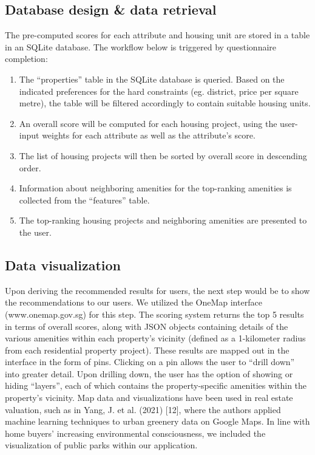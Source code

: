 \documentclass[a4paper, 11pt]{article}
\begin{document}
\subsection{Database design \& data retrieval}

The pre-computed scores for each attribute and housing unit are stored in a table in an SQLite database. The workflow below is triggered by questionnaire completion:

\begin{enumerate}
    \item The “properties” table in the SQLite database is queried. Based on the indicated preferences for the hard constraints (eg. district, price per square metre), the table will be filtered accordingly to contain suitable housing units.
    \item An overall score will be computed for each housing project, using the user-input weights for each attribute as well as the attribute’s score.
    \item The list of housing projects will then be sorted by overall score in descending order.
    \item Information about neighboring amenities for the top-ranking amenities is collected from the “features” table.
    \item The top-ranking housing projects and neighboring amenities are presented to the user.
\end{enumerate}

\subsection{Data visualization}

Upon deriving the recommended results for users, the next step would be to show the recommendations to our users. We utilized the OneMap interface (www.onemap.gov.sg) for this step. The scoring system returns the top 5 results in terms of overall scores, along with JSON objects containing details of the various amenities within each property's vicinity (defined as a 1-kilometer radius from each residential property project). These results are mapped out in the interface in the form of pins. Clicking on a pin allows the user to “drill down” into greater detail. Upon drilling down, the user has the option of showing or hiding “layers”, each of which contains the property-specific amenities within the property's vicinity. Map data and visualizations have been used in real estate valuation, such as in Yang, J. et al. (2021) [12], where the authors applied machine learning techniques to urban greenery data on Google Maps. In line with home buyers’ increasing environmental consciousness, we included the visualization of public parks within our application. 
\end{document}
